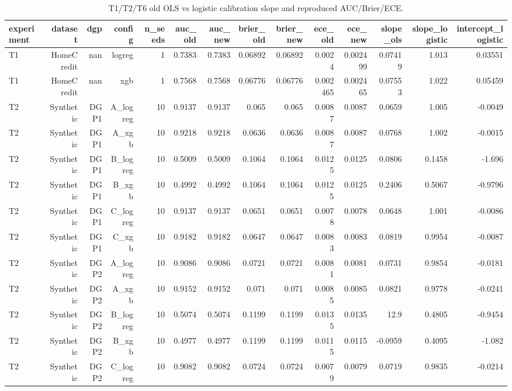 \begin{table}[htbp]
  \centering
  \caption{T1/T2/T6 old OLS vs logistic calibration slope and reproduced AUC/Brier/ECE.}
  \label{tab:T1_calibration_old_vs_new}
  \small
  \begin{tabular}{lrrrrrrrrrrrrr}
    \toprule
    experiment & dataset & dgp & config & n\_seeds & auc\_old & auc\_new & brier\_old & brier\_new & ece\_old & ece\_new & slope\_ols & slope\_logistic & intercept\_logistic \\
    \midrule
    T1 & HomeCredit & nan & logreg & 1 & 0.7383 & 0.7383 & 0.06892 & 0.06892 & 0.0024 & 0.002499 & 0.07419 & 1.013 & 0.03551 \\
    T1 & HomeCredit & nan & xgb & 1 & 0.7568 & 0.7568 & 0.06776 & 0.06776 & 0.002465 & 0.002465 & 0.07553 & 1.022 & 0.05459 \\
    T2 & Synthetic & DGP1 & A\_logreg & 10 & 0.9137 & 0.9137 & 0.065 & 0.065 & 0.0087 & 0.0087 & 0.0659 & 1.005 & -0.0049 \\
    T2 & Synthetic & DGP1 & A\_xgb & 10 & 0.9218 & 0.9218 & 0.0636 & 0.0636 & 0.0087 & 0.0087 & 0.0768 & 1.002 & -0.0015 \\
    T2 & Synthetic & DGP1 & B\_logreg & 10 & 0.5009 & 0.5009 & 0.1064 & 0.1064 & 0.0125 & 0.0125 & 0.0806 & 0.1458 & -1.696 \\
    T2 & Synthetic & DGP1 & B\_xgb & 10 & 0.4992 & 0.4992 & 0.1064 & 0.1064 & 0.0125 & 0.0125 & 0.2406 & 0.5067 & -0.9796 \\
    T2 & Synthetic & DGP1 & C\_logreg & 10 & 0.9137 & 0.9137 & 0.0651 & 0.0651 & 0.0078 & 0.0078 & 0.0648 & 1.001 & -0.0086 \\
    T2 & Synthetic & DGP1 & C\_xgb & 10 & 0.9182 & 0.9182 & 0.0647 & 0.0647 & 0.0083 & 0.0083 & 0.0819 & 0.9954 & -0.0087 \\
    T2 & Synthetic & DGP2 & A\_logreg & 10 & 0.9086 & 0.9086 & 0.0721 & 0.0721 & 0.0081 & 0.0081 & 0.0731 & 0.9854 & -0.0181 \\
    T2 & Synthetic & DGP2 & A\_xgb & 10 & 0.9152 & 0.9152 & 0.071 & 0.071 & 0.0085 & 0.0085 & 0.0821 & 0.9778 & -0.0241 \\
    T2 & Synthetic & DGP2 & B\_logreg & 10 & 0.5074 & 0.5074 & 0.1199 & 0.1199 & 0.0135 & 0.0135 & 12.9 & 0.4805 & -0.9454 \\
    T2 & Synthetic & DGP2 & B\_xgb & 10 & 0.4977 & 0.4977 & 0.1199 & 0.1199 & 0.0115 & 0.0115 & -0.0959 & 0.4095 & -1.082 \\
    T2 & Synthetic & DGP2 & C\_logreg & 10 & 0.9082 & 0.9082 & 0.0724 & 0.0724 & 0.0079 & 0.0079 & 0.0719 & 0.9835 & -0.0214 \\

\end{tabular}
\end{table}
